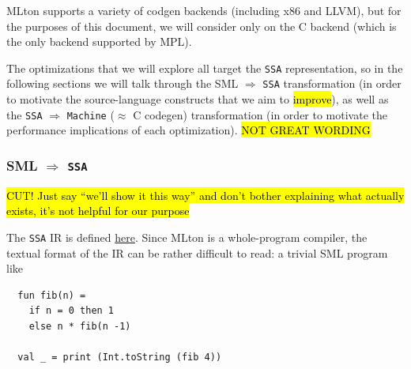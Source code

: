\documentclass[leqno,11pt]{article}
\begin{document}
MLton supports a variety of codgen backends (including x86 and LLVM), but for
the purposes of this document, we will consider only on the C backend (which is
the only backend supported by MPL).

The optimizations that we will explore all target the \texttt{SSA}
representation, so in the following sections we will talk through the SML
$\Rightarrow$ \texttt{SSA} transformation (in order to motivate the source-language
constructs that we aim to \hl{improve}), as well as the \texttt{SSA} $\Rightarrow$
\texttt{Machine} ($\approx$ C codegen) transformation (in order to motivate the
performance implications of each optimization). \hl{NOT GREAT WORDING}

\subsubsection{SML $\Rightarrow$ \texttt{SSA}}

\hl{CUT! Just say ``we'll show it this way'' and don't bother explaining what
  actually exists, it's not helpful for our purpose}

The \texttt{SSA} IR is defined
\href{https://github.com/MLton/mlton/blob/e44f16ca8cbe1eea16657bf5bd9208f7de158436/mlton/ssa/ssa-tree.sig#L15-L245}{here}.
Since MLton is a whole-program compiler, the textual format of the IR can be
rather difficult to read: a trivial SML program like


\begin{verbatim}
  fun fib(n) =
    if n = 0 then 1
    else n * fib(n -1)

  val _ = print (Int.toString (fib 4))
\end{verbatim}
\end{document}
